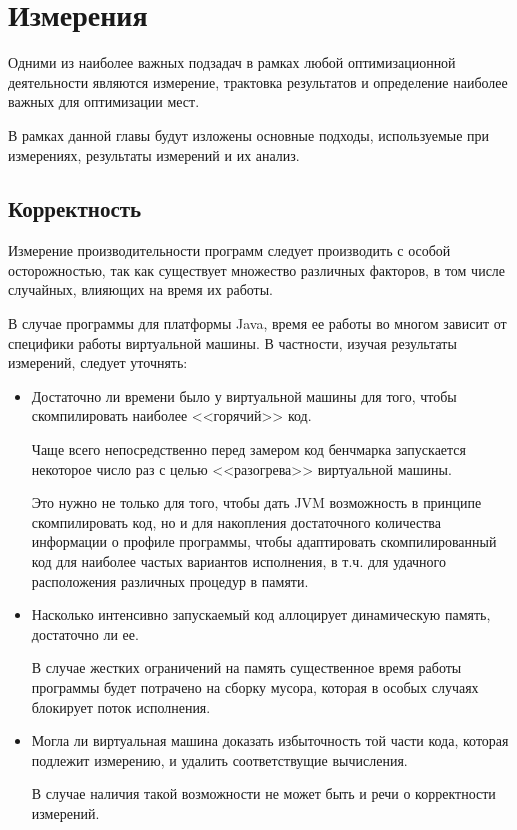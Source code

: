 \newpage
\section{Измерения}

Одними из наиболее важных подзадач в рамках любой оптимизационной деятельности являются измерение,
трактовка результатов и определение наиболее важных для оптимизации мест.

В рамках данной главы будут изложены основные подходы, используемые при измерениях, результаты
измерений и их анализ.

\subsection{Корректность}
Измерение производительности программ следует производить с особой осторожностью, так как существует
множество различных факторов, в том числе случайных, влияющих на время их работы.

В случае программы для платформы Java, время ее работы во многом зависит от специфики работы
виртуальной машины.
В частности, изучая результаты измерений, следует уточнять:
\begin{itemize}
    \item Достаточно ли времени было у виртуальной машины для того, чтобы скомпилировать наиболее
    <<горячий>> код.

    Чаще всего непосредственно перед замером код бенчмарка запускается некоторое число раз с целью
    <<разогрева>> виртуальной машины.

    Это нужно не только для того, чтобы дать JVM возможность в принципе скомпилировать код, но и
    для накопления достаточного количества информации о профиле программы, чтобы адаптировать
    скомпилированный код для наиболее частых вариантов исполнения, в т.ч. для удачного расположения
    различных процедур в памяти.

    \item Насколько интенсивно запускаемый код аллоцирует динамическую память, достаточно ли ее.

    В случае жестких ограничений на память существенное время работы программы будет потрачено
    на сборку мусора, которая в особых случаях блокирует поток исполнения.

    \item Могла ли виртуальная машина доказать избыточность той части кода, которая подлежит
    измерению, и удалить соответствущие вычисления.

    В случае наличия такой возможности не может быть и речи о корректности измерений.
\end{itemize}

